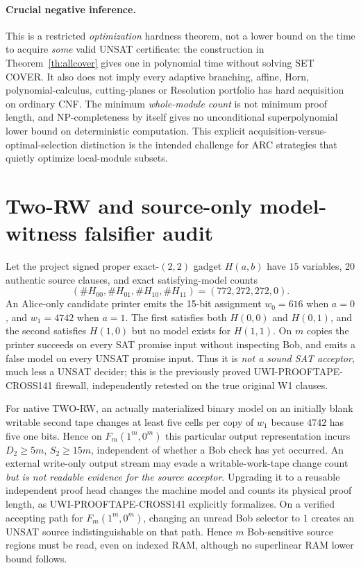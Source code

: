 \paragraph{Crucial negative inference.}
This is a restricted \emph{optimization} hardness theorem, not a lower bound on the time to acquire \emph{some} valid UNSAT certificate: the construction in Theorem~\ref{th:allcover} gives one in polynomial time without solving SET COVER. It also does not imply every adaptive branching, affine, Horn, polynomial-calculus, cutting-planes or Resolution portfolio has hard acquisition on ordinary CNF. The minimum \emph{whole-module count} is not minimum proof length, and NP-completeness by itself gives no unconditional superpolynomial lower bound on deterministic computation. This explicit acquisition-versus-optimal-selection distinction is the intended challenge for ARC strategies that quietly optimize local-module subsets.

\section{Two-RW and source-only model-witness falsifier audit}
Let the project signed proper exact-$(2,2)$ gadget $H(a,b)$ have $15$ variables, $20$ authentic source clauses, and exact satisfying-model counts
\[(\#H_{00},\#H_{01},\#H_{10},\#H_{11})=(772,272,272,0).\]
An Alice-only candidate printer emits the 15-bit assignment $w_0=616$ when $a=0$, and $w_1=4742$ when $a=1$. The first satisfies both $H(0,0)$ and $H(0,1)$, and the second satisfies $H(1,0)$ but no model exists for $H(1,1)$. On $m$ copies the printer succeeds on every SAT promise input without inspecting Bob, and emits a false model on every UNSAT promise input. Thus it is \emph{not a sound SAT acceptor}, much less a UNSAT decider; this is the previously proved UWI-PROOFTAPE-CROSS141 firewall, independently retested on the true original W1 clauses.

For native TWO-RW, an actually materialized binary model on an initially blank writable second tape changes at least five cells per copy of $w_1$ because $4742$ has five one bits. Hence on $F_m(1^m,0^m)$ this particular output representation incurs $D_2\ge5m$, $S_2\ge15m$, independent of whether a Bob check has yet occurred. An external write-only output stream may evade a writable-work-tape change count \emph{but is not readable evidence for the source acceptor}. Upgrading it to a reusable independent proof head changes the machine model and counts its physical proof length, as UWI-PROOFTAPE-CROSS141 explicitly formalizes. On a verified accepting path for $F_m(1^m,0^m)$, changing an unread Bob selector to $1$ creates an UNSAT source indistinguishable on that path. Hence $m$ Bob-sensitive source regions must be read, even on indexed RAM, although no superlinear RAM lower bound follows.

